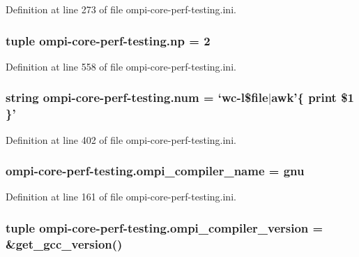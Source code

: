 Definition at line 273 of file ompi-\/core-\/perf-\/testing.\-ini.

\hypertarget{namespaceompi-core-perf-testing_a8703829fbfbe8a6c19e70d34f880b39e}{
\subsubsection[{np}]{\setlength{\rightskip}{0pt plus 5cm}tuple ompi-\/core-\/perf-\/testing.\-np = 2}}\label{namespaceompi-core-perf-testing_a8703829fbfbe8a6c19e70d34f880b39e}


Definition at line 558 of file ompi-\/core-\/perf-\/testing.\-ini.

\hypertarget{namespaceompi-core-perf-testing_acd38c99cb54f2722bedc9c1103afeee9}{
\subsubsection[{num}]{\setlength{\rightskip}{0pt plus 5cm}string ompi-\/core-\/perf-\/testing.\-num = `wc-\/l\$file$\vert$awk'\{ print \$1 \}'}}\label{namespaceompi-core-perf-testing_acd38c99cb54f2722bedc9c1103afeee9}


Definition at line 402 of file ompi-\/core-\/perf-\/testing.\-ini.

\hypertarget{namespaceompi-core-perf-testing_adcf0f97184536c2477a499f2db08f783}{
\subsubsection[{ompi\-\_\-compiler\-\_\-name}]{\setlength{\rightskip}{0pt plus 5cm}ompi-\/core-\/perf-\/testing.\-ompi\-\_\-compiler\-\_\-name = gnu}}\label{namespaceompi-core-perf-testing_adcf0f97184536c2477a499f2db08f783}


Definition at line 161 of file ompi-\/core-\/perf-\/testing.\-ini.

\hypertarget{namespaceompi-core-perf-testing_a6bc0385f02dc808bb726283b67157b17}{
\subsubsection[{ompi\-\_\-compiler\-\_\-version}]{\setlength{\rightskip}{0pt plus 5cm}tuple ompi-\/core-\/perf-\/testing.\-ompi\-\_\-compiler\-\_\-version = \&get\-\_\-gcc\-\_\-version()}}\label{namespaceompi-core-perf-testing_a6bc0385f02dc808bb726283b67157b17}


